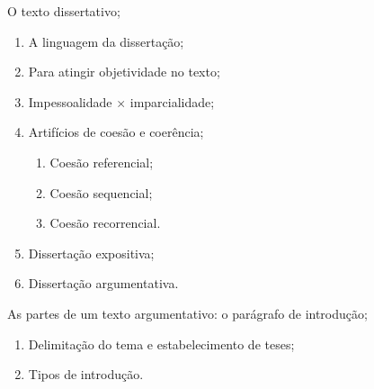 \begin{pud}
	
	\programa
		\begin{description}[itemsep=0em]
	   	\item[UNIDADE I:] O texto dissertativo;
	            \begin{enumerate}[itemsep=0em, topsep=0em]
			    \item A linguagem da dissertação;
			    \item Para atingir objetividade no texto; 
			     \item Impessoalidade $\times$ imparcialidade;
    		    \item Artifícios de coesão e coerência;
                    \begin{enumerate}[label*=\arabic*., itemsep=0em]
                        \item Coesão referencial;
                        \item Coesão sequencial;
                        \item Coesão recorrencial.
                    \end{enumerate}
                \item Dissertação expositiva;
                \item Dissertação argumentativa.


			\end{enumerate}   
	   
	    \item[UNIDADE II:] As partes de um texto argumentativo: o parágrafo de introdução;
	         \begin{enumerate}[itemsep=0em, topsep=0em]                
                \item  Delimitação do tema e estabelecimento de teses;
                \item Tipos de introdução.
            \end{enumerate}
            

\end{description}
\end{pud}
